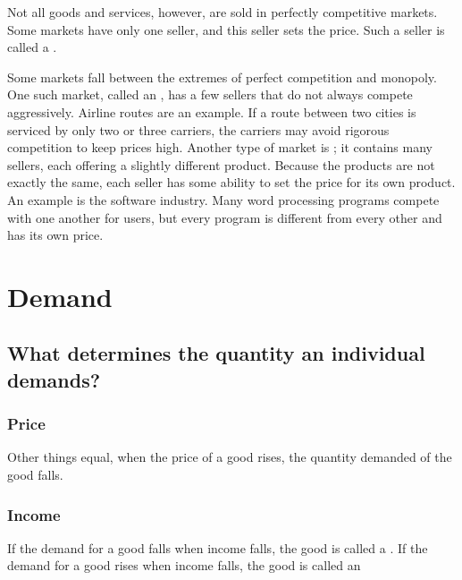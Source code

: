 Not all goods and services, however, are sold in perfectly competitive markets.
Some markets have only one seller, and this seller sets the price.
Such a seller is called a .


Some markets fall between the extremes of perfect competition and monopoly.
One such market, called an , has a few sellers that do not always compete aggressively. 
Airline routes are an example.
If a route between two cities is serviced by only two or three carriers, the carriers may avoid rigorous competition to keep prices high.
Another type of market is ; it contains many sellers, each offering a slightly different product.
Because the products are not exactly the same, each seller has some ability to set the price for its own product.
An example is the software industry.
Many word processing programs compete with one another for users, but every program is different from every other and has its own price.



\section{Demand}

\begin{tcolorbox}
\end{tcolorbox}

\subsection{What determines the quantity an individual demands?}

\subsubsection{Price}

Other things equal, when the price of a good rises, the quantity demanded of the good falls.


\subsubsection{Income}

If the demand for a good falls when income falls, the good is called a .
If the demand for a good rises when income falls, the good is called an 


